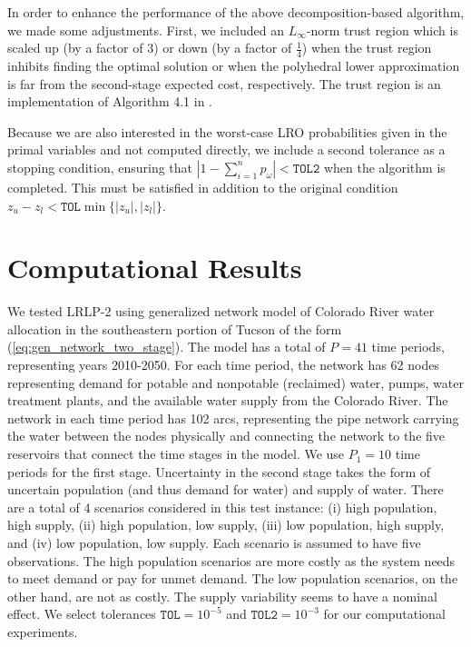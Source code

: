 \documentclass[11pt]{article}
\begin{document}
In order to enhance the performance of the above decomposition-based algorithm, we made some adjustments.
First, we included an $L_\infty$-norm trust region which is scaled up (by a factor of $3$) or down (by a factor of $\tfrac{1}{4}$) when the trust region inhibits finding the optimal solution or when the polyhedral lower approximation is far from the second-stage expected cost, respectively.
The trust region is an implementation of Algorithm 4.1 in \cite{nocedal1999numerical}.

Because we are also interested in the worst-case LRO probabilities given in the primal variables and not computed directly, we include a second tolerance as a stopping condition, ensuring that $\left| 1 - \sum_{i=1}^n p_\omega \right| < \texttt{TOL2}$ when the algorithm is completed.
This must be satisfied in addition to the original condition $z_u - z_l < \texttt{TOL}\min\{|z_u|,|z_l|\}$.

\section{Computational Results} \label{sec:comp_results}

We tested LRLP-2 using generalized network model of Colorado River water allocation in the southeastern portion of Tucson of the form (\ref{eq:gen_network_two_stage}).
The model has a total of $P = 41$ time periods, representing years 2010-2050. %
For each time period, the network has 62 nodes representing demand for potable and nonpotable (reclaimed) water, pumps, water treatment plants, and the available water supply from the Colorado River.
The network in each time period has 102 arcs, representing the pipe network carrying the water between the nodes physically and connecting the network to the five reservoirs that connect the time stages in the model.
We use $P_1 = 10$ time periods for the first stage.
Uncertainty in the second stage takes the form of uncertain population (and thus demand for water) and supply of water.
There are a total of 4 scenarios considered in this test instance: (i) high population, high supply, (ii) high population, low supply, (iii) low population, high supply, and (iv) low population, low supply.
Each scenario is assumed to have five observations.
The high population scenarios are more costly as the system needs to meet demand or pay for unmet demand.
The low population scenarios, on the other hand, are not as costly. The supply variability seems to have a nominal effect. 
We select tolerances $\texttt{TOL} = 10^{-5}$ and $\texttt{TOL2} = 10^{-3}$ for our computational experiments.
\end{document}
